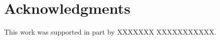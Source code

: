 \documentclass{llncs}
\begin{document}
\section{Acknowledgments}
%
This work was supported in part by 
XXXXXXX XXXXXXXXXXX.


%
%









\clearpage
{} %
\renewcommand{\indexname}{Author Index}
\printindex
\clearpage

\end{document}

